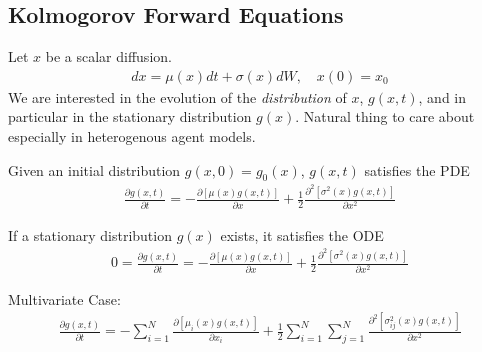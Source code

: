 \documentclass[11pt]{elegantbook}
\begin{document}
\subsection{Kolmogorov Forward Equations}
Let $x$ be a scalar diffusion.
\begin{equation}
    \begin{aligned}
        dx=\mu(x)dt+\sigma(x)dW,\quad x(0)=x_0
    \end{aligned}
    \nonumber
\end{equation}
We are interested in the evolution of the \textit{distribution} of $x$, $g(x,t)$, and in particular in the stationary distribution $g(x)$. Natural thing to care about especially in heterogenous agent models.
\begin{proposition}
    Given an initial distribution $g(x,0) = g_0(x)$, $g(x,t)$ satisfies the PDE
    \begin{equation}
        \begin{aligned}
            \frac{\partial g(x,t)}{\partial t}=-\frac{\partial [\mu(x)g(x,t)]}{\partial x}+\frac{1}{2}\frac{\partial^2 [\sigma^2(x)g(x,t)]}{\partial x^2}
        \end{aligned}
        \nonumber
    \end{equation}
\end{proposition}

\begin{corollary}
    If a stationary distribution $g(x)$ exists, it satisfies the ODE
    \begin{equation}
        \begin{aligned}
            0=\frac{\partial g(x,t)}{\partial t}=-\frac{\partial [\mu(x)g(x,t)]}{\partial x}+\frac{1}{2}\frac{\partial^2 [\sigma^2(x)g(x,t)]}{\partial x^2}
        \end{aligned}
        \nonumber
    \end{equation}
\end{corollary}
Multivariate Case:
\begin{equation}
    \begin{aligned}
        \frac{\partial g(x,t)}{\partial t}=-\sum_{i=1}^N\frac{\partial [\mu_i(x)g(x,t)]}{\partial x_i}+\frac{1}{2}\sum_{i=1}^N\sum_{j=1}^N \frac{\partial^2 [\sigma_{ij}^2(x)g(x,t)]}{\partial x^2}
    \end{aligned}
    \nonumber
\end{equation}
\end{document}
